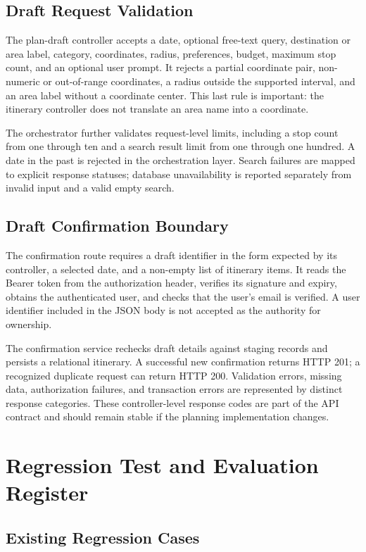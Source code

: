 \section{Draft Request Validation}

The plan-draft controller accepts a date, optional free-text query, destination or area label, category, coordinates, radius, preferences, budget, maximum stop count, and an optional user prompt. It rejects a partial coordinate pair, non-numeric or out-of-range coordinates, a radius outside the supported interval, and an area label without a coordinate center. This last rule is important: the itinerary controller does not translate an area name into a coordinate.

The orchestrator further validates request-level limits, including a stop count from one through ten and a search result limit from one through one hundred. A date in the past is rejected in the orchestration layer. Search failures are mapped to explicit response statuses; database unavailability is reported separately from invalid input and a valid empty search.

\section{Draft Confirmation Boundary}

The confirmation route requires a draft identifier in the form expected by its controller, a selected date, and a non-empty list of itinerary items. It reads the Bearer token from the authorization header, verifies its signature and expiry, obtains the authenticated user, and checks that the user's email is verified. A user identifier included in the JSON body is not accepted as the authority for ownership.

The confirmation service rechecks draft details against staging records and persists a relational itinerary. A successful new confirmation returns HTTP 201; a recognized duplicate request can return HTTP 200. Validation errors, missing data, authorization failures, and transaction errors are represented by distinct response categories. These controller-level response codes are part of the API contract and should remain stable if the planning implementation changes.\chapter{Regression Test and Evaluation Register}
\label{app:evaluation}

\section{Existing Regression Cases}

